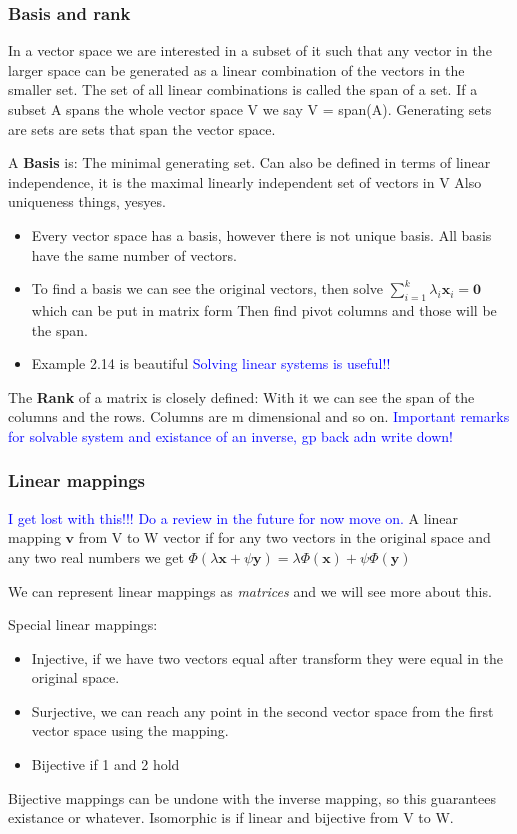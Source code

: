 \documentclass{article}
\newcommand{\tblue}[1]{\textcolor{blue}{#1}}
\begin{document}
\subsubsection{Basis and rank}
In a vector space we are interested in a subset of it such that any vector in the larger space 
can be generated as a linear combination of the vectors in the smaller set.
The set of all linear combinations is called the span of a set. If a subset A spans the whole vector space V we say 
V = span(A). Generating sets are sets are sets that span the vector space.

A \textbf{Basis} is: The minimal generating set.
Can also be defined in terms of linear independence, it is the maximal linearly independent set of vectors in V
Also uniqueness things, yesyes.
\begin{itemize}
    \item Every vector space has a basis, however there is not unique basis. All basis have the same number of vectors.
    \item To find a basis we can see the original vectors, then solve $\sum_{i=1}^{k}\lambda_i \textbf{x}_i = \textbf{0}$ which can be put in matrix form
    Then find pivot columns and those will be the span. 
    \item Example 2.14 is beautiful \tblue{Solving linear systems is useful!!}
\end{itemize}

The \textbf{Rank} of a matrix is closely defined:
With it we can see the span of the columns and the rows. Columns are m dimensional and so on.
\tblue{Important remarks for solvable system and existance of an inverse, gp back adn write down!}

\subsubsection{Linear mappings}
\tblue{I get lost with this!!! Do a review in the future for now move on.}
A linear mapping $\textbf{v}$ from V to W vector if for any two vectors in the original space
and any two real numbers we get $\Phi (\lambda \textbf{x} + \psi  \textbf{y}) =\lambda \Phi ( \textbf{x}) +\psi  \Phi (\textbf{y})$

We can represent linear mappings as \textit{matrices} and we will see more about this.

Special linear mappings:
\begin{itemize}
    \item Injective, if we have two vectors equal after transform they were equal in the original space.
    \item Surjective, we can reach any point in the second vector space from the first vector space using the mapping.
    \item Bijective if 1 and 2 hold
\end{itemize}
Bijective mappings can be undone with the inverse mapping, so this guarantees existance or whatever.
Isomorphic is if linear and bijective from V to W. 
\end{document}
